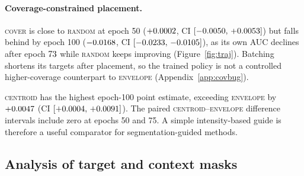 \documentclass{article}
\newcommand{\ArmBest}{\textsc{centroid}}
\begin{document}
\paragraph{Coverage-constrained placement.}
\textsc{cover} is close to \textsc{random} at epoch 50 ($+0.0002$, CI
$[-0.0050,\,+0.0053]$) but falls behind by epoch 100
($-0.0168$, CI $[-0.0233,\,-0.0105]$), as its own AUC
declines after epoch $73$ while \textsc{random} keeps improving
(Figure~\ref{fig:traj}). Batching shortens its
targets after placement, so the trained policy is not a controlled
higher-coverage counterpart to \textsc{envelope} (Appendix~\ref{app:covbug}).

\ArmBest{} has the highest epoch-100 point estimate, exceeding
\textsc{envelope} by $+0.0047$ (CI
$[+0.0004,\,+0.0091]$). The paired \ArmBest{}--\textsc{envelope}
difference intervals include zero at epochs 50 and 75.
A simple intensity-based guide is therefore a useful comparator for
segmentation-guided methods.

\subsection{Analysis of target and context masks}
\label{sec:results-h3}
\end{document}
